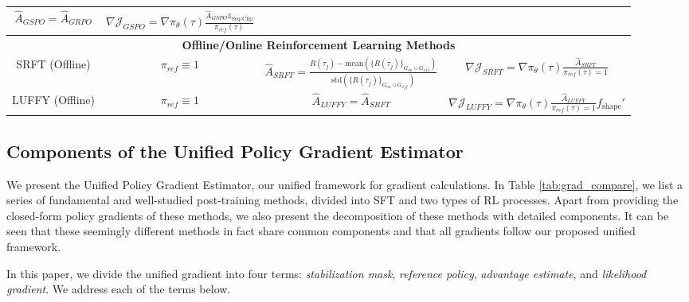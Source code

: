 \documentclass{article} %
\newcommand{\0}{\mathbb{0}}
\newcommand{\1}{\mathbb{1}}
\begin{document}
\begin{table}[!t]
{\begin{tabular}{cccc}
        $\hat{A}_{GSPO} = \hat{A}_{GRPO}$ & 
        $\nabla \mathcal{J}_{GSPO} = \nabla \pi_\theta (\tau) \frac{\hat{A}_{GSPO} \mathbb{1}_{\text{Seq-Clip}}}{\pi_{ref} (\tau)}$\\
        \midrule
        \multicolumn{4}{c}{\textbf{Offline/Online Reinforcement Learning Methods}} \\
        \midrule
         \makecell{SRFT (Offline)\\\citep{fu2025srft}} & $\pi_{ref} \equiv 1$&
        $\hat{A}_{SRFT} = \frac{R(\tau_{j}) - \text{mean} (\{R(\tau_{j})\}_{G_{on}\cup G_{off}})}{\text{std} (\{R(\tau_{j})\}_{G_{on}\cup G_{off}})}$ & 
        $\nabla \mathcal{J}_{SRFT} = \nabla \pi_\theta (\tau) \frac{\hat{A}_{SRFT}}{\pi_{ref} (\tau) = 1}$\\
        \midrule
         \makecell{LUFFY (Offline)\\\citep{yan2025learning}} & $\pi_{ref} \equiv 1$&
        $\hat{A}_{LUFFY} = \hat{A}_{SRFT}$ & 
        $\nabla \mathcal{J}_{LUFFY} = \nabla \pi_\theta (\tau) \frac{\hat{A}_{LUFFY}}{\pi_{ref} (\tau) = 1} f_{\text{shape}}'$ \\
    \bottomrule
    \end{tabular}
    }
\end{table}




\subsection{Components of the Unified Policy Gradient Estimator}
\label{Components of the Unified Policy Gradient Estimator}


We present the Unified Policy Gradient Estimator, our unified framework for gradient calculations. In Table \ref{tab:grad_compare}, we list a series of fundamental and well-studied post-training methods, divided into SFT and two types of RL processes. Apart from providing the closed-form policy gradients of these methods, we also present the decomposition of these methods with detailed components. It can be seen that these seemingly different methods in fact share common components and that all gradients follow our proposed unified framework.

In this paper, we divide the unified gradient into four terms: \textit{stabilization mask}, \textit{reference policy}, \textit{advantage estimate}, and \textit{likelihood gradient}. We address each of the terms below.
\end{document}
